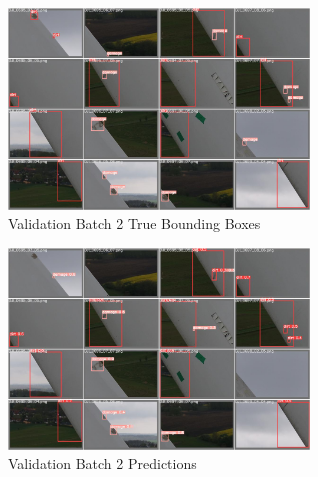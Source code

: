\documentclass[conference]{IEEEtran}
\begin{document}
\begin{figure}[H]
    \centering
    \includegraphics[width=8cm]{Images/YOLOv5s/val_batch2_labels.jpg}
    \caption{Validation Batch 2 True Bounding Boxes}
\end{figure}
\begin{figure}[H]
    \centering
    \includegraphics[width=8cm]{Images/YOLOv5s/val_batch2_pred.jpg}
    \caption{Validation Batch 2 Predictions}
\end{figure}
\cleardoublepage
\end{document}
